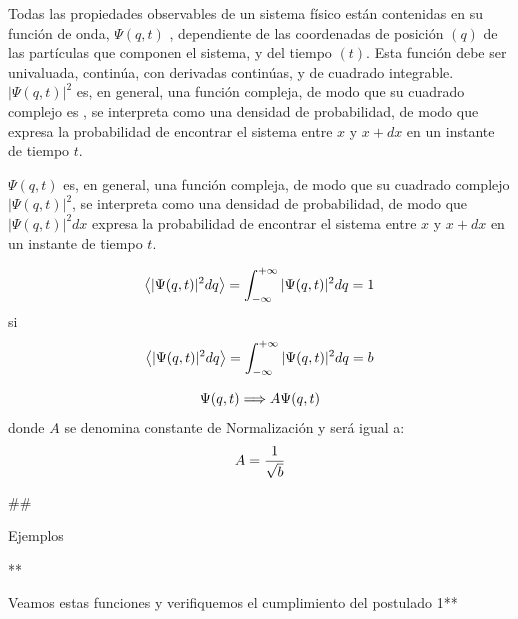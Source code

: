 \documentclass[11pt]{article}
\begin{document}
    Todas las propiedades observables de un sistema físico están contenidas
en su función de onda, \(\Psi(q, t)\) , dependiente de las coordenadas
de posición \((q)\) de las partículas que componen el sistema, y del
tiempo \((t)\). Esta función debe ser univaluada, continúa, con
derivadas continúas, y de cuadrado integrable. \(|\Psi(q,t)|^2\) es, en
general, una función compleja, de modo que su cuadrado complejo es , se
interpreta como una densidad de probabilidad, de modo que expresa la
probabilidad de encontrar el sistema entre \(x\) y \(x+dx\) en un
instante de tiempo \(t\).

    \(\Psi(q,t)\) es, en general, una función compleja, de modo que su
cuadrado complejo \(|\Psi(q,t)|^2\), se interpreta como una densidad de
probabilidad, de modo que \(|\Psi(q,t)|^2dx\) expresa la probabilidad de
encontrar el sistema entre \(x\) y \(x+dx\) en un instante de tiempo
\(t\).

    \[\large \left<|\Psi(q,t)|^2dq\right>=\int^{+\infty}_{-\infty} |\Psi(q,t)|^2dq=1\]
si
\[\large \left<|\Psi(q,t)|^2dq\right>=\int^{+\infty}_{-\infty} |\Psi(q,t)|^2dq=b\]

\[\large \Psi(q,t)\Longrightarrow A\Psi(q,t)\] donde \(A\) se denomina
constante de Normalización y será igual a:
\[\large A=\frac{1}{\sqrt{b}}\]

    \#\#

Ejemplos

    **

Veamos estas funciones y verifiquemos el cumplimiento del postulado 1**
\end{document}
